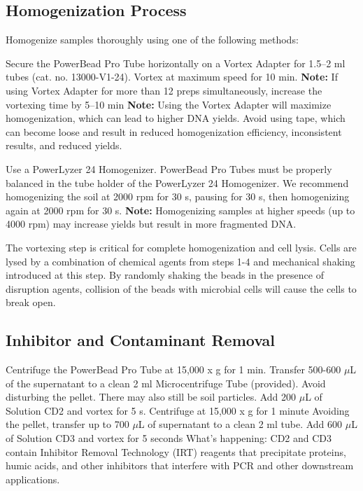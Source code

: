 \documentclass[12pt]{SOP5_beta}\usepackage[]{graphicx}\usepackage[]{xcolor}
\begin{document}
\subsection*{Homogenization Process} 
\NP Homogenize samples thoroughly using one of the following methods: 
\begin{itemize*}
  \item Secure the PowerBead Pro Tube horizontally on a Vortex Adapter for 1.5–2 ml tubes (cat. no. 13000-V1-24). Vortex at maximum speed for 10 min. \textbf{Note:} If using Vortex Adapter for more than 12 preps simultaneously, increase the vortexing time by 5–10 min \textbf{Note:} Using the Vortex Adapter will maximize homogenization, which can lead to higher DNA yields. Avoid using tape, which can become loose and result in reduced homogenization efficiency, inconsistent results, and reduced yields.
  \item Use a PowerLyzer 24 Homogenizer. PowerBead Pro Tubes must be properly balanced in the tube holder of the PowerLyzer 24 Homogenizer. We recommend homogenizing the soil at 2000 rpm for 30 s, pausing for 30 s, then homogenizing again at 2000 rpm for 30 s. \textbf{Note:} Homogenizing samples at higher speeds (up to 4000 rpm) may increase yields but result in more fragmented DNA.
\end{itemize*}

\noindent The vortexing step is critical for complete homogenization and cell lysis. Cells are lysed by a combination of chemical agents from steps 1-4 and mechanical shaking introduced at this step. By randomly shaking the beads in the presence of disruption agents, collision of the beads with microbial cells will cause the cells to break open.

\subsection*{Inhibitor and Contaminant Removal}
\NP Centrifuge the PowerBead Pro Tube at 15,000 x g for 1 min.
\NP Transfer 500-600 $\mu$L of the supernatant to a clean 2 ml Microcentrifuge Tube (provided). Avoid disturbing the pellet. There may also still be soil particles.
\NP Add 200 $\mu$L of Solution CD2 and vortex for 5 s.
\NP Centrifuge at 15,000 x g for 1 minute
\NP Avoiding the pellet, transfer up to 700 $\mu$L of supernatant to a clean 2 ml tube. 
\NP Add 600 $\mu$L of Solution CD3 and vortex for 5 seconds
\noindent What's happening: CD2 and CD3 contain Inhibitor Removal Technology (IRT) reagents that precipitate proteins, humic acids, and other inhibitors that interfere with PCR and other downstream applications.
\end{document}
